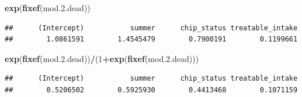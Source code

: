\documentclass[]{article}
\newenvironment{Shaded}{\begin{snugshade}}{\end{snugshade}}
\newcommand{\KeywordTok}[1]{\textcolor[rgb]{0.13,0.29,0.53}{\textbf{#1}}}
\newcommand{\DecValTok}[1]{\textcolor[rgb]{0.00,0.00,0.81}{#1}}
\newcommand{\FloatTok}[1]{\textcolor[rgb]{0.00,0.00,0.81}{#1}}
\newcommand{\OperatorTok}[1]{\textcolor[rgb]{0.81,0.36,0.00}{\textbf{#1}}}
\newcommand{\NormalTok}[1]{#1}
\begin{document}
\begin{Shaded}
\begin{Highlighting}[]
\KeywordTok{exp}\NormalTok{(}\KeywordTok{fixef}\NormalTok{(mod.}\FloatTok{2.}\NormalTok{dead))}
\end{Highlighting}
\end{Shaded}

\begin{verbatim}
##      (Intercept)           summer      chip_status treatable_intake 
##        1.0861591        1.4545479        0.7900191        0.1199661
\end{verbatim}

\begin{Shaded}
\begin{Highlighting}[]
\KeywordTok{exp}\NormalTok{(}\KeywordTok{fixef}\NormalTok{(mod.}\FloatTok{2.}\NormalTok{dead))}\OperatorTok{/}\NormalTok{(}\DecValTok{1}\OperatorTok{+}\KeywordTok{exp}\NormalTok{(}\KeywordTok{fixef}\NormalTok{(mod.}\FloatTok{2.}\NormalTok{dead)))}
\end{Highlighting}
\end{Shaded}

\begin{verbatim}
##      (Intercept)           summer      chip_status treatable_intake 
##        0.5206502        0.5925930        0.4413468        0.1071159
\end{verbatim}
\end{document}
